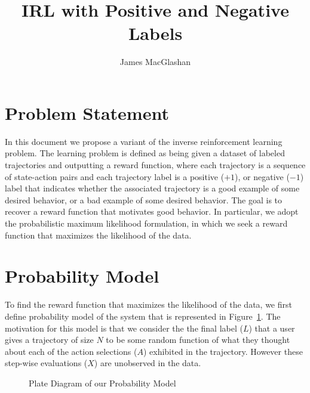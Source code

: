 \documentclass{article}
\title{IRL with Positive and Negative Labels}
\author{James MacGlashan}
\date{}
\begin{document}
\maketitle

\section{Problem Statement}
In this document we propose a variant of the inverse reinforcement learning problem. The learning problem is defined as being given a dataset of labeled trajectories and outputting a reward function, where each trajectory is a sequence of state-action pairs and each trajectory label is a positive ($+1$), or negative ($-1$) label that indicates whether the associated trajectory is a good example of some desired behavior, or a bad example of some desired behavior. The goal is to recover a reward function that motivates good behavior. In particular, we adopt the probabilistic maximum likelihood formulation, in which we seek a reward function that maximizes the likelihood of the data.

\section{Probability Model}
To find the reward function that maximizes the likelihood of the data, we first define probability model of the system that is represented in Figure~\ref{fig:gm}. The motivation for this model is that we consider the the final label ($L$) that a user gives a trajectory of size $N$ to be some random function of what they thought about each of the action selections ($A$) exhibited in the trajectory. However these step-wise evaluations ($X$) are unobserved in the data.
\begin{figure}
\centering
{}
\caption{Plate Diagram of our Probability Model}
\label{fig:gm}
\end{figure}
\end{document}
